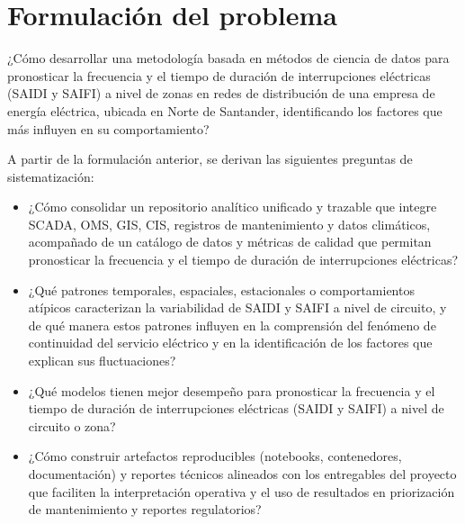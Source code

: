 \section{Formulación del problema}


¿Cómo desarrollar una metodología basada en métodos de ciencia de datos para pronosticar la frecuencia y el tiempo de duración de interrupciones eléctricas (SAIDI y SAIFI) a nivel de zonas en redes de distribución de una empresa de energía eléctrica, ubicada en Norte de Santander, identificando los factores que más influyen en su comportamiento?

A partir de la formulación anterior, se derivan las siguientes preguntas de sistematización:

\begin{itemize}
    \item ¿Cómo consolidar un repositorio analítico unificado y trazable que integre SCADA, OMS, GIS, CIS, registros de mantenimiento y datos climáticos, acompañado de un catálogo de datos y métricas de calidad que permitan pronosticar la frecuencia y el tiempo de duración de interrupciones eléctricas?
    
    \item ¿Qué patrones temporales, espaciales, estacionales o comportamientos atípicos caracterizan la variabilidad de SAIDI y SAIFI a nivel de circuito, y de qué manera estos patrones influyen en la comprensión del fenómeno de continuidad del servicio eléctrico y en la identificación de los factores que explican sus fluctuaciones?
    
    \item ¿Qué modelos tienen mejor desempeño para pronosticar la frecuencia y el tiempo de duración de interrupciones eléctricas (SAIDI y SAIFI) a nivel de circuito o zona?
    
    \item ¿Cómo construir artefactos reproducibles (notebooks, contenedores, documentación) y reportes técnicos alineados con los entregables del proyecto que faciliten la interpretación operativa y el uso de resultados en priorización de mantenimiento y reportes regulatorios?
\end{itemize}


